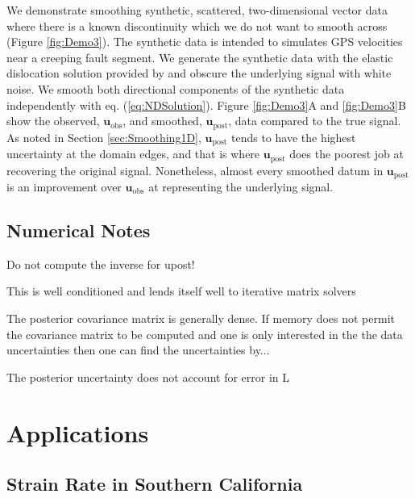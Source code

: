 \documentclass[10pt,a4paper]{article}
\begin{document}
We demonstrate smoothing synthetic, scattered, two-dimensional vector data where there is a known discontinuity which we do not want to smooth across (Figure \ref{fig:Demo3}). The synthetic data is intended to simulates GPS velocities near a creeping fault segment. We generate the synthetic data with the elastic dislocation solution provided by \citet{Okada1992} and obscure the underlying signal with white noise. We smooth both directional components of the synthetic data independently with eq. (\ref{eq:NDSolution}). Figure \ref{fig:Demo3}A and \ref{fig:Demo3}B show the observed, $\mathbf{u}_\mathrm{obs}$, and smoothed, $\mathbf{u}_\mathrm{post}$, data compared to the true signal.  As noted in Section \ref{sec:Smoothing1D}, $\mathbf{u}_\mathrm{post}$ tends to have the highest uncertainty at the domain edges, and that is where $\mathbf{u}_\mathrm{post}$ does the poorest job at recovering the original signal.  Nonetheless, almost every smoothed datum in $\mathbf{u}_\mathrm{post}$ is an improvement over $\mathbf{u}_\mathrm{obs}$ at representing the underlying signal. 

\subsection{Numerical Notes}
Do not compute the inverse for upost!

This is well conditioned and lends itself well to iterative matrix solvers

The posterior covariance matrix is generally dense.  If memory does not permit the covariance matrix to be computed and one is only interested in the the data uncertainties then one can find the uncertainties by...

The posterior uncertainty does not account for error in L  

\section{Applications}\label{sec:Applications}

\subsection{Strain Rate in Southern California}\label{sec:ApplicationsSoCal}
\end{document}

